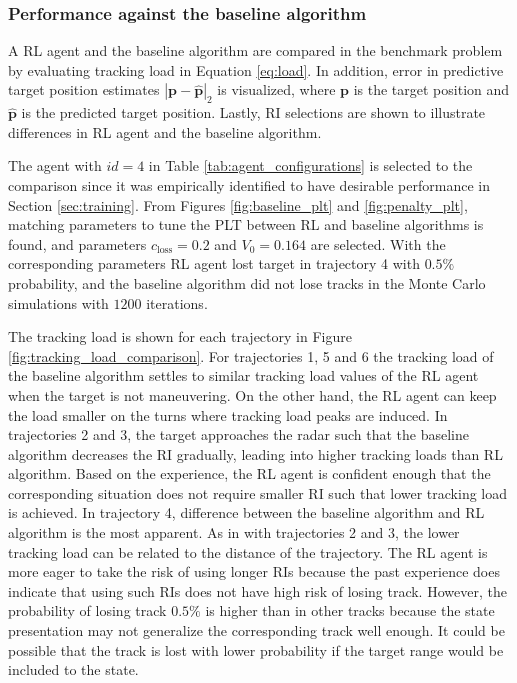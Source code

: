 \documentclass[english, 12pt, a4paper, elec, utf8, a-1b, online]{aaltothesis}
\renewcommand{\vec}[1]{\mathbf{#1}}
\newcommand{\closs}{c_\text{loss}}
\begin{document}
\subsubsection{Performance against the baseline algorithm} \label{sec:against_baseline}

A RL agent and the baseline algorithm are compared in the benchmark problem by evaluating tracking load in Equation \eqref{eq:load}.
In addition, error in predictive target position estimates $|\vec{p}-\hat{\vec{p}}|_2$ is visualized, where $\vec{p}$ is the target position and $\hat{\vec{p}}$ is the predicted target position.
Lastly, RI selections are shown to illustrate differences in RL agent and the baseline algorithm.

The agent with $id=4$ in Table \ref{tab:agent_configurations} is selected to the comparison since it was empirically identified to have desirable performance in Section \ref{sec:training}.
From Figures \ref{fig:baseline_plt} and \ref{fig:penalty_plt}, matching parameters to tune the PLT between RL and baseline algorithms is found, and parameters $\closs = 0.2$ and $V_0=0.164$ are selected.
With the corresponding parameters RL agent lost target in trajectory 4 with $0.5\%$ probability, and the baseline algorithm did not lose tracks in the Monte Carlo simulations with $1200$ iterations.

The tracking load is shown for each trajectory in Figure \ref{fig:tracking_load_comparison}.
For trajectories 1, 5 and 6 the tracking load of the baseline algorithm settles to similar tracking load values of the RL agent when the target is not maneuvering. 
On the other hand, the RL agent can keep the load smaller on the turns where tracking load peaks are induced.
In trajectories 2 and 3, the target approaches the radar such that the baseline algorithm decreases the RI gradually, leading into higher tracking loads than RL algorithm.
Based on the experience, the RL agent is confident enough that the corresponding situation does not require smaller RI such that lower tracking load is achieved.
In trajectory 4, difference between the baseline algorithm and RL algorithm is the most apparent.
As in with trajectories 2 and 3, the lower tracking load can be related to the distance of the trajectory.
The RL agent is more eager to take the risk of using longer RIs because the past experience does indicate that using such RIs does not have high risk of losing track.
However, the probability of losing track $0.5\%$ is higher than in other tracks because the state presentation may not generalize the corresponding track well enough.
It could be possible that the track is lost with lower probability if the target range would be included to the state.
\end{document}
